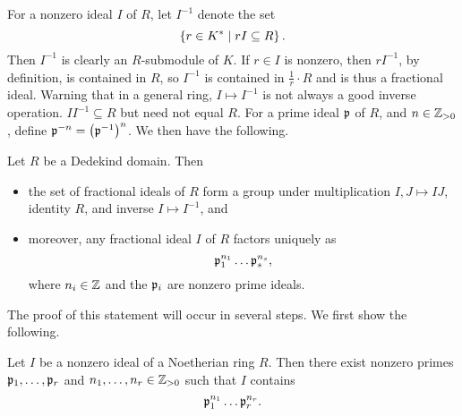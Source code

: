 For a nonzero ideal $ I $ of $ R $, let $ I^{-1} $ denote the set
$$ \left\{ r \in K^* \mid rI \subseteq R \right\}. $$
Then $ I^{-1} $ is clearly an $ R $-submodule of $ K $. If $ r \in I $ is nonzero, then $ rI^{-1} $, by definition, is contained in $ R $, so $ I^{-1} $ is contained in $ \tfrac{1}{r} \cdot R $ and is thus a fractional ideal. Warning that in a general ring, $ I \mapsto I^{-1} $ is not always a good inverse operation. $ II^{-1} \subseteq R $ but need not equal $ R $. For a prime ideal $ \mathfrak{p} $ of $ R $, and $ n \in \mathbb{Z}_{> 0} $, define $ \mathfrak{p}^{-n} = \left( \mathfrak{p}^{-1} \right)^n $. We then have the following.

\begin{theorem}
Let $ R $ be a Dedekind domain. Then
\begin{itemize}
\item the set of fractional ideals of $ R $ form a group under multiplication $ I, J \mapsto IJ $, identity $ R $, and inverse $ I \mapsto I^{-1} $, and
\item moreover, any fractional ideal $ I $ of $ R $ factors uniquely as
$$ \mathfrak{p}_1^{n_1} \dots \mathfrak{p}_s^{n_s}, $$
where $ n_i \in \mathbb{Z} $ and the $ \mathfrak{p}_i $ are nonzero prime ideals.
\end{itemize}
\end{theorem}

\pagebreak


The proof of this statement will occur in several steps. We first show the following.

\begin{proposition}
Let $ I $ be a nonzero ideal of a Noetherian ring $ R $. Then there exist nonzero primes $ \mathfrak{p}_1, \dots, \mathfrak{p}_r $ and $ n_1, \dots, n_r \in \mathbb{Z}_{> 0} $ such that $ I $ contains
$$ \mathfrak{p}_1^{n_1} \dots \mathfrak{p}_r^{n_r}. $$
\end{proposition}

